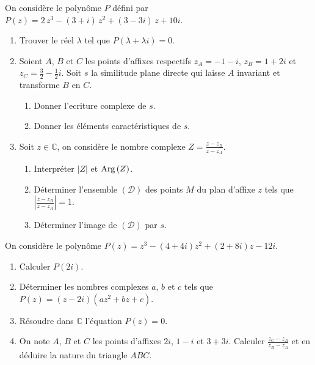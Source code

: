 \begin{exo}
      On consid\`ere le polyn\^ome $P$ d\'efini par 
      $P(z) = 2 \, z^{3} - \left(3 + i\right) \, z^{2} + \left( 3 - 3 i \right) \, z + 10 i$.
      \begin{enumerate}
            \item Trouver le r\'eel $\lambda$ tel que $P(\lambda + \lambda i) = 0$.
            \item Soient $A$, $B$ et $C$ les points d'affixes respectifs 
                  $z_A = -1-i$, $z_B = 1+2i$ et $z_C = \frac{3}{2}-\frac{1}{2}i$.
                  Soit $s$ la similitude plane directe qui laisse $A$ invariant et transforme $B$ en $C$.
                  \begin{enumerate}
                        \item Donner l'ecriture complexe de $s$.
                        \item Donner les \'el\'ements caract\'eristiques de $s$.
                  \end{enumerate}
            \item Soit $z\in\mathbb{C}$, on consid\`ere le nombre complexe $Z = \frac{z - z_B}{z - z_A}$.
                  \begin{enumerate}
                        \item Interpr\'eter $|Z|$ et $\mathrm{Arg}\left( Z \right)$.
                        \item D\'eterminer l'ensemble $(\mathscr{D})$ des points $M$ du plan d'affixe $z$ tels que 
                              $|\frac{z - z_B}{z - z_A}| = 1$.
                        \item D\'eterminer l'image de $(\mathscr{D})$ par $s$.
                  \end{enumerate}
      \end{enumerate}
\end{exo}
\begin{exo}
	On consid\`ere le polyn\^ome $P(z) = z^3 - (4+4i) z^2 + (2+8i) z - 12 i$.
	\begin{enumerate}
		\item Calculer $P(2i)$.
		\item D\'eterminer les nombres complexes $a$, $b$ et $c$ tels que $P(z) = (z - 2i)(a z^2 + b z + c)$.
		\item R\'esoudre dans $\mathbb{C}$ l'\'equation $P(z) = 0$.
		\item On note $A$, $B$ et $C$ les points d'affixes $2i$, $1 - i$ et $3 + 3i$.
		      Calculer $\frac{z_C - z_A}{z_B - z_A}$ et en d\'eduire la nature du triangle $ABC$.
	\end{enumerate}
\end{exo}
